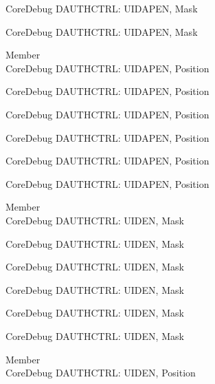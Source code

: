 \begin{DoxyRefList}
\label{deprecated__deprecated001192}%
%
Core\+Debug DAUTHCTRL\+: UIDAPEN, Mask 

\label{deprecated__deprecated001294}%
%
Core\+Debug DAUTHCTRL\+: UIDAPEN, Mask  
\item[Member \doxylink{group___c_m_s_i_s___s_c_b_ga57a2ef70f6cc1e0903a8c3740512de46}{Core\+Debug\+\_\+\+DAUTHCTRL\+\_\+\+UIDAPEN\+\_\+\+Pos} ]\hfill \\
\label{deprecated__deprecated000081}%
%
Core\+Debug DAUTHCTRL\+: UIDAPEN, Position 

\label{deprecated__deprecated000532}%
%
Core\+Debug DAUTHCTRL\+: UIDAPEN, Position 

\label{deprecated__deprecated000634}%
%
Core\+Debug DAUTHCTRL\+: UIDAPEN, Position 

\label{deprecated__deprecated000740}%
%
Core\+Debug DAUTHCTRL\+: UIDAPEN, Position 

\label{deprecated__deprecated001191}%
%
Core\+Debug DAUTHCTRL\+: UIDAPEN, Position 

\label{deprecated__deprecated001293}%
%
Core\+Debug DAUTHCTRL\+: UIDAPEN, Position  
\item[Member \doxylink{group___c_m_s_i_s___s_c_b_ga7d84e1642469f5c20b7ef7fa76a4fe95}{Core\+Debug\+\_\+\+DAUTHCTRL\+\_\+\+UIDEN\+\_\+\+Msk} ]\hfill \\
\label{deprecated__deprecated000080}%
%
Core\+Debug DAUTHCTRL\+: UIDEN, Mask 

\label{deprecated__deprecated000531}%
%
Core\+Debug DAUTHCTRL\+: UIDEN, Mask 

\label{deprecated__deprecated000633}%
%
Core\+Debug DAUTHCTRL\+: UIDEN, Mask 

\label{deprecated__deprecated000739}%
%
Core\+Debug DAUTHCTRL\+: UIDEN, Mask 

\label{deprecated__deprecated001190}%
%
Core\+Debug DAUTHCTRL\+: UIDEN, Mask 

\label{deprecated__deprecated001292}%
%
Core\+Debug DAUTHCTRL\+: UIDEN, Mask  
\item[Member \doxylink{group___c_m_s_i_s___s_c_b_gab9cb997565a842f5eb9365bd58d7cda2}{Core\+Debug\+\_\+\+DAUTHCTRL\+\_\+\+UIDEN\+\_\+\+Pos} ]\hfill \\
\label{deprecated__deprecated000079}%
%
Core\+Debug DAUTHCTRL\+: UIDEN, Position 


\end{DoxyRefList}
